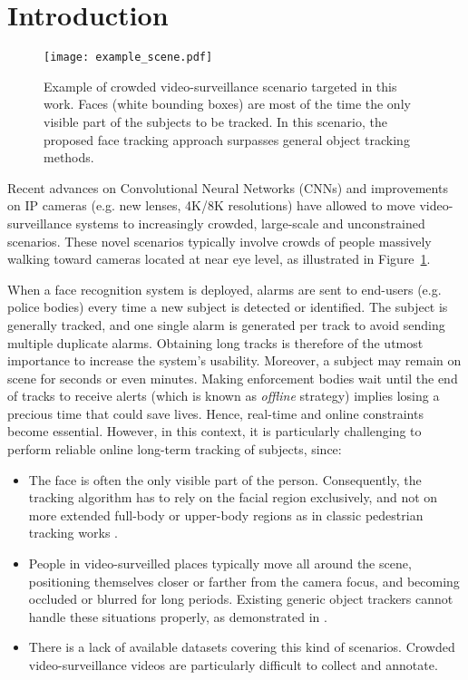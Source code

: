 \FloatBarrier
\section{Introduction}

\begin{figure}[t!]
\centering
\texttt{[image: example\_scene.pdf]}
\caption{Example of crowded video-surveillance scenario targeted in this work. Faces (white bounding boxes) are most of the time the only visible part of the subjects to be tracked. In this scenario, the proposed face tracking approach surpasses general object tracking methods.}
\label{fig:crowded_onlyfaces}
\end{figure}

Recent advances on Convolutional Neural Networks (CNNs) and improvements on IP cameras (e.g. new lenses, 4K/8K resolutions) have allowed to move video-surveillance systems to increasingly crowded, large-scale and unconstrained scenarios.    
These novel scenarios typically involve crowds of people massively walking toward cameras located at near eye level, as illustrated in Figure~\ref{fig:crowded_onlyfaces}. 

When a face recognition system is deployed, alarms are sent to end-users (e.g. police bodies) every time a new subject is detected or identified. The subject is generally tracked, and one single alarm is generated per track to avoid sending multiple duplicate alarms. Obtaining long tracks is therefore of the utmost importance to increase the system's usability.  Moreover, a subject may remain on scene for seconds or even minutes. Making enforcement bodies wait until the end of tracks to receive alerts (which is known as \textit{offline} strategy) implies losing a precious time that could save lives. Hence, real-time and online constraints become essential. However, in this context, it is particularly challenging to perform reliable online long-term tracking of subjects, since: 

\begin{itemize}
    \item The face is often the only visible part of the person. Consequently, the tracking algorithm has to rely on the facial region exclusively, and not on more extended full-body or upper-body regions as in classic pedestrian tracking works \cite{li2014datasetCUHK,chen2019integrated}.
    \item People in video-surveilled places typically move all around the scene, positioning themselves closer or farther from the camera focus, and becoming occluded or blurred for long periods. Existing generic object trackers cannot handle these situations properly, as demonstrated in \cite{lin2019mobiface}.
    \item There is a lack of available datasets covering this kind of scenarios. Crowded video-surveillance videos are particularly difficult to collect and annotate.
\end{itemize}

